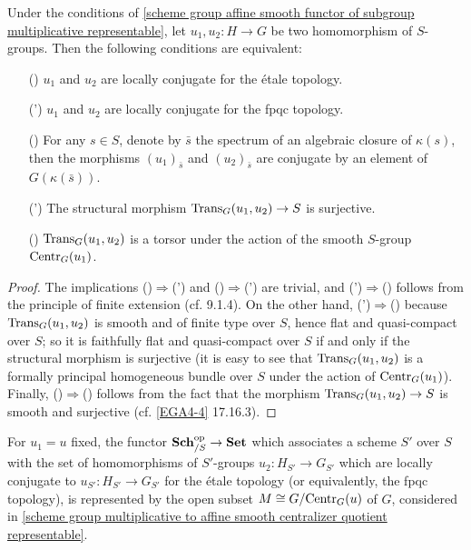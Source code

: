 \begin{proposition}\label{scheme group multiplicative to affine smooth morphism conjugate iff}
Under the conditions of \cref{scheme group affine smooth functor of subgroup multiplicative representable}, let $u_1,u_2:H\to G$ be two homomorphism of $S$-groups. Then the following conditions are equivalent:
\begin{enumerate}
    \item[(\rmnum{1})] $u_1$ and $u_2$ are locally conjugate for the \'etale topology.
    \item[(\rmnum{1}')] $u_1$ and $u_2$ are locally conjugate for the fpqc topology.
    \item[(\rmnum{2})] For any $s\in S$, denote by $\bar{s}$ the spectrum of an algebraic closure of $\kappa(s)$, then the morphisms $(u_1)_{\bar{s}}$ and $(u_2)_{\bar{s}}$ are conjugate by an element of $G(\kappa(\bar{s}))$.
    \item[(\rmnum{2}')] The structural morphism $\mathrm{Trans}_G(u_1,u_2)\to S$ is surjective.
    \item[(\rmnum{3})] $\mathrm{Trans}_G(u_1,u_2)$ is a torsor under the action of the smooth $S$-group $\mathrm{Centr}_G(u_1)$.   
\end{enumerate}
\end{proposition}
\begin{proof}
The implications ()$\Rightarrow$(') and ()$\Rightarrow$(') are trivial, and (')$\Rightarrow$() follows from the principle of finite extension (cf. \cite{EGA4-3} 9.1.4). On the other hand, (')$\Rightarrow$() because $\mathrm{Trans}_G(u_1,u_2)$ is smooth and of finite type over $S$, hence flat and quasi-compact over $S$; so it is faithfully flat and quasi-compact over $S$ if and only if the structural morphism is surjective (it is easy to see that $\mathrm{Trans}_G(u_1,u_2)$ is a formally principal homogeneous bundle over $S$ under the action of $\mathrm{Centr}_G(u_1)$). Finally, ()$\Rightarrow$() follows from the fact that the morphism $\mathrm{Trans}_G(u_1,u_2)\to S$ is smooth and surjective (cf. \cref{EGA4-4} 17.16.3). 
\end{proof}

\begin{remark}\label{scheme group multiplicative to affine smooth functor of conjugate morphism representable}
For $u_1=u$ fixed, the functor $\mathbf{Sch}_{/S}^{\mathrm{op}}\to\mathbf{Set}$ which associates a scheme $S'$ over $S$ with the set of homomorphisms of $S'$-groups $u_2:H_{S'}\to G_{S'}$ which are locally conjugate to $u_{S'}:H_{S'}\to G_{S'}$ for the \'etale topology (or equivalently, the fpqc topology), is represented by the open subset $M\cong G/\mathrm{Centr}_G(u)$ of $G$, considered in \cref{scheme group multiplicative to affine smooth centralizer quotient representable}.
\end{remark}

